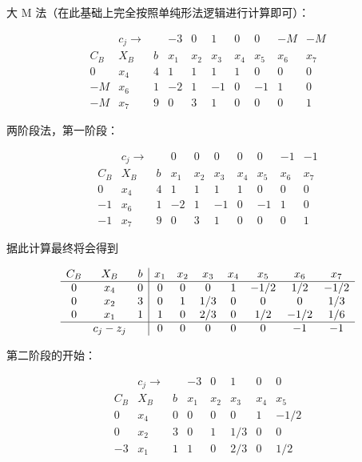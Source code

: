 \documentclass[UTF8, 6pt]{ctexart}
\newcommand{\mcompress}{\vspace{-10 px}}
\begin{document}
大 M 法（在此基础上完全按照单纯形法逻辑进行计算即可）：

\mcompress
\[
\begin{array}{ccc|ccccccc}
	    & c_j \rightarrow &   & -3  &  0  &  1  &  0  &  0  & -M  & -M  \\\hline
	C_B &       X_B       & b & x_1 & x_2 & x_3 & x_4 & x_5 & x_6 & x_7 \\ \hline
	 0  &       x_4       & 4 &  1  &  1  &  1  &  1  &  0  &  0  &  0  \\
	-M  &       x_6       & 1 & -2  &  1  & -1  &  0  & -1  &  1  &  0  \\
	-M  &       x_7       & 9 &  0  &  3  &  1  &  0  &  0  &  0  &  1 
\end{array}
\]
\mcompress

两阶段法，第一阶段：

\mcompress
\[
\begin{array}{ccc|ccccccc}
	    & c_j \rightarrow &   &  0  &  0  &  0  &  0  &  0  & -1  & -1  \\\hline
	C_B &       X_B       & b & x_1 & x_2 & x_3 & x_4 & x_5 & x_6 & x_7 \\ \hline
	 0  &       x_4       & 4 &  1  &  1  &  1  &  1  &  0  &  0  &  0  \\
	-1  &       x_6       & 1 & -2  &  1  & -1  &  0  & -1  &  1  &  0  \\
	-1  &       x_7       & 9 &  0  &  3  &  1  &  0  &  0  &  0  &  1
\end{array}
\]
\mcompress

据此计算最终将会得到

\mcompress
\[
\begin{array}{ccc|ccccccc}
	C_B &   X_B   & b & x_1 & x_2 & x_3 & x_4 & x_5  & x_6  & x_7  \\ \hline
	 0  &   x_4   & 0 &  0  &  0  &  0  &  1  & -1/2 & 1/2  & -1/2 \\
	 0  &   x_2   & 3 &  0  &  1  & 1/3 &  0  &  0   &  0   & 1/3  \\
	 0  &   x_1   & 1 &  1  &  0  & 2/3 &  0  & 1/2  & -1/2 & 1/6  \\ \hline
	    & c_j-z_j &   &  0  &  0  &  0  &  0  &  0   &  -1  &  -1
\end{array}
\]
\mcompress

第二阶段的开始：

\mcompress
\[
\begin{array}{ccc|ccccc}
	    & c_j \rightarrow &   & -3  &  0  &  1  &  0  &  0   \\ \hline
	C_B &       X_B       & b & x_1 & x_2 & x_3 & x_4 & x_5  \\ \hline
	 0  &       x_4       & 0 &  0  &  0  &  0  &  1  & -1/2 \\
	 0  &       x_2       & 3 &  0  &  1  & 1/3 &  0  &  0   \\
	-3  &       x_1       & 1 &  1  &  0  & 2/3 &  0  & 1/2  \\
\end{array}
\]
\mcompress
	
\end{document}
